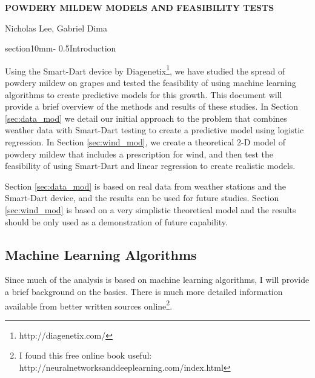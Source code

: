 \documentclass[letterpaper,12pt]{article}
\makeatletter
\renewcommand{\section}{\@startsection%
{section}{1}{0mm}{-\baselineskip}%
{0.5\baselineskip}{\normalfont\Large\bfseries}}%
\makeatother
\begin{document}
\pagestyle{plain}



\begin{center} 
\bfseries\uppercase{%
Powdery Mildew Models and Feasibility Tests
}

Nicholas Lee, Gabriel Dima
\end{center}

\section{Introduction}

%
%

Using the Smart-Dart device by Diagenetix\footnote{http://diagenetix.com/}, we have studied the spread of powdery mildew on grapes and tested the feasibility of using machine learning algorithms to create predictive models for this growth. This document will provide a brief overview of the methods and results of these studies. In Section \ref{sec:data_mod} we detail our initial approach to the problem that combines weather data with Smart-Dart testing to create a predictive model using logistic regression. In Section \ref{sec:wind_mod}, we create a theoretical 2-D model of powdery mildew that includes a prescription for wind, and then test the feasibility of using Smart-Dart and linear regression to create realistic models. 

Section \ref{sec:data_mod} is based on real data from weather stations and the Smart-Dart device, and the results can be used for future studies. Section \ref{sec:wind_mod} is based on a very simplistic theoretical model and the results should be only used as a demonstration of future capability. 

\subsection{Machine Learning Algorithms}

Since much of the analysis is based on machine learning algorithms, I will provide a brief background on the basics. There is much more detailed information available from better written sources online\footnote{I found this free online book useful: http://neuralnetworksanddeeplearning.com/index.html}. 
\end{document}
